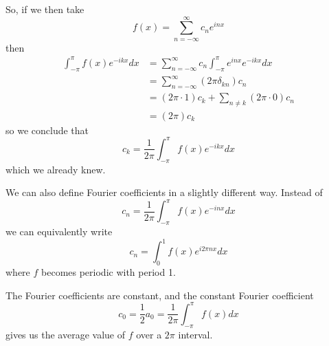 So, if we then take
\begin{equation}
f(x) = \sum^{\infty}_{n=-\infty}c_{n}e^{inx}
\end{equation}
then
\begin{subequations}
\begin{align}
\int^{\pi}_{-\pi}f(x)e^{-ikx}dx &=
\sum^{\infty}_{n=-\infty}c_{n}\int^{\pi}_{-\pi}e^{inx}e^{-ikx}dx\\
&=\sum^{\infty}_{n=-\infty}(2\pi\delta_{kn})c_{n} \\
&=(2\pi\cdot1)c_{k} + \sum_{n\neq k}(2\pi\cdot 0)c_{n} \\
&=(2\pi)c_{k}
\end{align}
\end{subequations}
so we conclude that
\begin{equation}
c_{k} = \frac{1}{2\pi}\int^{\pi}_{-\pi}f(x)e^{-ikx}dx
\end{equation}
which we already knew.

\begin{rmk}
We can also define Fourier coefficients in a slightly
different way. Instead of
\begin{equation}
c_{n} = \frac{1}{2\pi}\int^{\pi}_{-\pi}f(x)e^{-inx}dx
\end{equation}
we can equivalently write
\begin{equation}
c_{n} = \int^{1}_{0}f(x)e^{i2\pi nx}dx
\end{equation}
where $f$ becomes periodic with period 1.
\end{rmk}
\begin{rmk}
The Fourier coefficients are constant, and the constant
Fourier coefficient 
$$ c_0 = \frac{1}{2}a_{0} =
\frac{1}{2\pi}\int^{\pi}_{-\pi}f(x)dx $$
gives us the average value of $f$ over a $2\pi$ interval.
\end{rmk}


